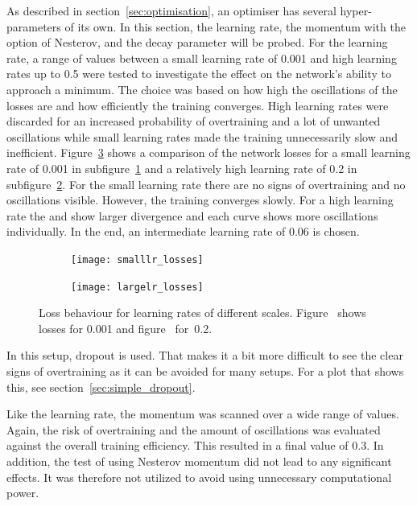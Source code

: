 As described in section~\ref{sec:optimisation}, an optimiser has several hyper-parameters of its own. In this section, the learning rate, the momentum with the option of Nesterov, and the decay parameter will be probed.
For the learning rate, a range of values between a small learning rate of \num{0.001} and high learning rates up to \num{0.5} were tested to investigate the effect on the network's ability to approach a minimum. The choice was based on how high the oscillations of the losses are and how efficiently the training converges. High learning rates were discarded for an increased probability of overtraining and a lot of unwanted oscillations while small learning rates made the training unnecessarily slow and inefficient. Figure~\ref{fig:lr} shows a comparison of the network losses for a small learning rate of \num{0.001} in subfigure~\ref{fig:lr:small} and a relatively high learning rate of \num{0.2} in subfigure~\ref{fig:lr:large}. For the small learning rate there are no signs of overtraining and no oscillations visible. However, the training converges slowly. For a high learning rate the \losstrain and \losstest show larger divergence and each curve shows more oscillations individually. In the end, an intermediate learning rate of \num{0.06} is chosen.
%
\begin{figure}[htbp]
    \centering
    \begin{subfigure}[b]{0.48\textwidth}
        \texttt{[image: smalllr\_losses]}
        \caption{}
        \label{fig:lr:small}
    \end{subfigure}
\quad
    \begin{subfigure}[b]{0.48\textwidth}
        \texttt{[image: largelr\_losses]}
        \caption{}
        \label{fig:lr:large}
    \end{subfigure}
    \caption[Classifier loss for different learning rates]{Loss behaviour for learning rates of different scales. Figure~ shows losses for \num{0.001} and figure~ for~\num{0.2}.}
	\label{fig:lr}
\end{figure}
%
In this setup, dropout is used. That makes it a bit more difficult to see the clear signs of overtraining as it can be avoided for many setups. For a plot that shows this, see section~\ref{sec:simple_dropout}.

Like the learning rate, the momentum was scanned over a wide range of values. Again, the risk of overtraining and the amount of oscillations was evaluated against the overall training efficiency. This resulted in a final value of \num{0.3}. In addition, the test of using Nesterov momentum did not lead to any significant effects. It was therefore not utilized to avoid using unnecessary computational power.

